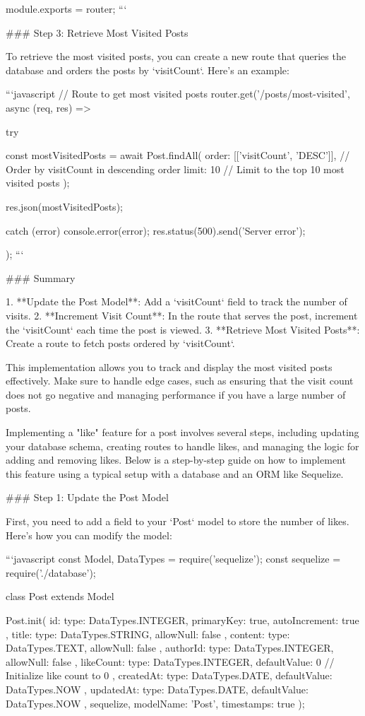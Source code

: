 module.exports = router;
```

### Step 3: Retrieve Most Visited Posts

To retrieve the most visited posts, you can create a new route that queries the database and orders the posts by `visitCount`. Here’s an example:

```javascript
// Route to get most visited posts
router.get('/posts/most-visited', async (req, res) => {
  try {
    const mostVisitedPosts = await Post.findAll({
      order: [['visitCount', 'DESC']], // Order by visitCount in descending order
      limit: 10 // Limit to the top 10 most visited posts
    });

    res.json(mostVisitedPosts);
  } catch (error) {
    console.error(error);
    res.status(500).send('Server error');
  }
});
```

### Summary

1. **Update the Post Model**: Add a `visitCount` field to track the number of visits.
2. **Increment Visit Count**: In the route that serves the post, increment the `visitCount` each time the post is viewed.
3. **Retrieve Most Visited Posts**: Create a route to fetch posts ordered by `visitCount`.

This implementation allows you to track and display the most visited posts effectively. Make sure to handle edge cases, such as ensuring that the visit count does not go negative and managing performance if you have a large number of posts.



Implementing a "like" feature for a post involves several steps, including updating your database schema, creating routes to handle likes, and managing the logic for adding and removing likes. Below is a step-by-step guide on how to implement this feature using a typical setup with a database and an ORM like Sequelize.

### Step 1: Update the Post Model

First, you need to add a field to your `Post` model to store the number of likes. Here’s how you can modify the model:

```javascript
const { Model, DataTypes } = require('sequelize');
const sequelize = require('./database');

class Post extends Model {}

Post.init({
  id: {
    type: DataTypes.INTEGER,
    primaryKey: true,
    autoIncrement: true
  },
  title: {
    type: DataTypes.STRING,
    allowNull: false
  },
  content: {
    type: DataTypes.TEXT,
    allowNull: false
  },
  authorId: {
    type: DataTypes.INTEGER,
    allowNull: false
  },
  likeCount: {
    type: DataTypes.INTEGER,
    defaultValue: 0 // Initialize like count to 0
  },
  createdAt: {
    type: DataTypes.DATE,
    defaultValue: DataTypes.NOW
  },
  updatedAt: {
    type: DataTypes.DATE,
    defaultValue: DataTypes.NOW
  }
}, {
  sequelize,
  modelName: 'Post',
  timestamps: true
});


